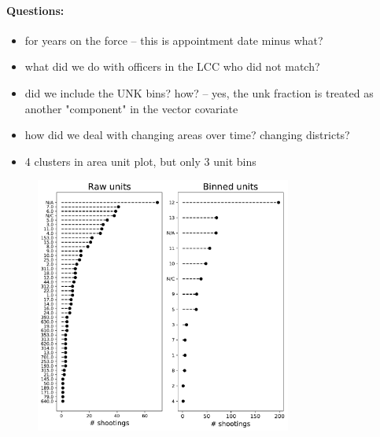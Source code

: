 







{\color{red}
\paragraph{Questions:}
\begin{itemize}
\item for years on the force -- this is appointment date minus what?  
\item what did we do with officers in the LCC who did not match?
\item did we include the UNK bins? how? -- yes, the unk fraction is treated as another "component" in the vector covariate
\item how did we deal with changing areas over time? changing districts?
\item 4 clusters in area unit plot, but only 3 unit bins
\end{itemize}
}

\begin{figure}[h!]
\centering
\includegraphics[width=0.75\textwidth]{figs/unit_plots.pdf}
\caption{}\label{fig:unitplots}
\end{figure}


